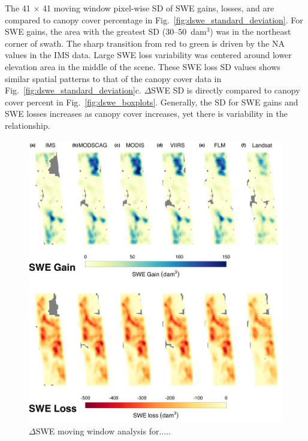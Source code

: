 The 41 $\times$ 41 moving window pixel-wise SD of SWE gains, losses, and are compared to canopy cover percentage in Fig.~\ref{fig:dswe_standard_deviation}. For SWE gains, the area with the greatest SD (30--50~dam$^{3}$) was in the northeast corner of swath. The sharp transition from red to green is driven by the NA values in the IMS data. Large SWE loss variability was centered around lower elevation area in the middle of the scene. These SWE loss SD values shows similar spatial patterns to that of the canopy cover data in Fig.~\ref{fig:dswe_standard_deviation}c. $\Delta$SWE SD is directly compared to canopy cover percent in Fig.~\ref{fig:dswe_boxplots}. Generally, the SD for SWE gains and SWE losses increases as canopy cover increases, yet there is variability in the relationship.

\clearpage
\begin{figure}[h]
\centering
\includegraphics[width=\textwidth]{figures/ch4_figs/dswe_mw_full_dam3_v1.png}
\caption{$\Delta$SWE moving window analysis for.....}
\label{fig:dswe_moving_window}
\end{figure}



